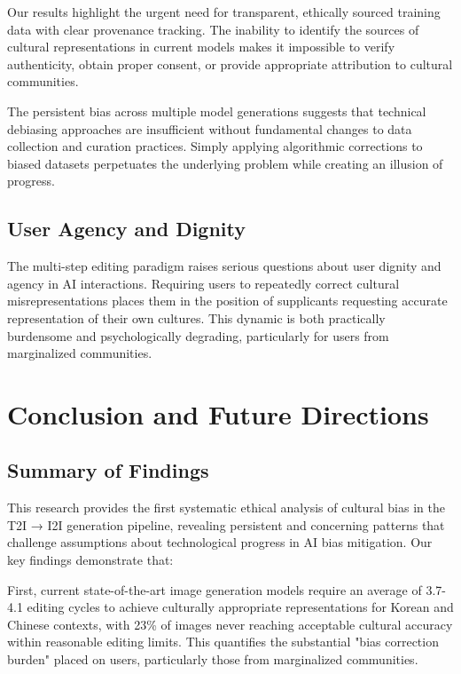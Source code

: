\documentclass{article}
\begin{document}
Our results highlight the urgent need for transparent, ethically sourced training data with clear provenance tracking. The inability to identify the sources of cultural representations in current models makes it impossible to verify authenticity, obtain proper consent, or provide appropriate attribution to cultural communities.

The persistent bias across multiple model generations suggests that technical debiasing approaches are insufficient without fundamental changes to data collection and curation practices. Simply applying algorithmic corrections to biased datasets perpetuates the underlying problem while creating an illusion of progress.

\subsection{User Agency and Dignity}

The multi-step editing paradigm raises serious questions about user dignity and agency in AI interactions. Requiring users to repeatedly correct cultural misrepresentations places them in the position of supplicants requesting accurate representation of their own cultures. This dynamic is both practically burdensome and psychologically degrading, particularly for users from marginalized communities.

\section{Conclusion and Future Directions}

\subsection{Summary of Findings}

This research provides the first systematic ethical analysis of cultural bias in the T2I → I2I generation pipeline, revealing persistent and concerning patterns that challenge assumptions about technological progress in AI bias mitigation. Our key findings demonstrate that:

First, current state-of-the-art image generation models require an average of 3.7-4.1 editing cycles to achieve culturally appropriate representations for Korean and Chinese contexts, with 23\% of images never reaching acceptable cultural accuracy within reasonable editing limits. This quantifies the substantial "bias correction burden" placed on users, particularly those from marginalized communities.
\end{document}
